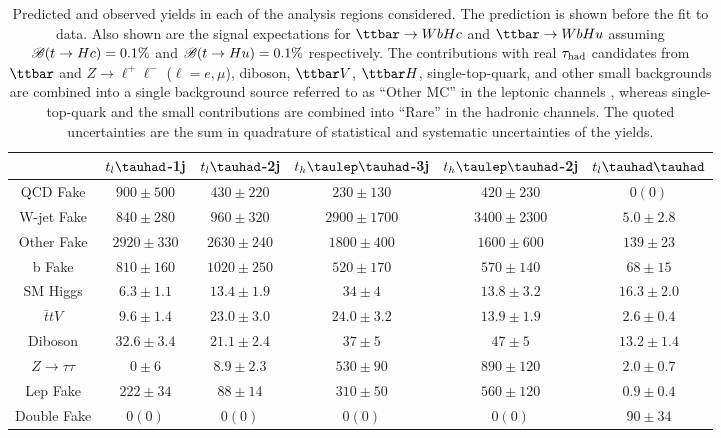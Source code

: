 \begin{table}[htbp]
\caption{
Predicted and observed yields in each of the analysis regions considered.
The prediction is shown before the fit to data. Also shown are the signal expectations for 
$\Hc$ and $\Hu$ assuming $\mathscr{B}(t\to Hc)=0.1\%$ and $\mathscr{B}(t\to Hu)=0.1\%$ respectively.
The contributions with real $\tau_{\mathrm{had}}$ candidates from $\ttbar$ and  $Z\to \ell^+\ell^-$ ($\ell = e, \mu$), diboson, $\ttbar V$, $\ttbar H$, single-top-quark, and other small backgrounds are combined into
a single background source referred to as ``Other MC'' in the leptonic channels , whereas single-top-quark and the small contributions are combined into ``Rare'' in the hadronic channels.  
The quoted uncertainties are the sum in quadrature of statistical and systematic uncertainties of the yields.}
\small
\centering
\begin{tabular}{cccccc} \toprule\toprule
 & $t_l\tauhad$-1j & $t_l\tauhad$-2j & $t_h\tlhad$-3j &$t_h\tlhad$-2j  & $t_l\thadhad$ \\\hline 
  QCD Fake                 & $900 \pm 500  $& $430 \pm 220  $& $230 \pm 130    $& $420 \pm 230        $& $0 (0)        $  \\ 
  W-jet Fake               & $840 \pm 280  $& $960 \pm 320  $& $2900 \pm 1700  $& $3400 \pm 2300      $& $5.0 \pm 2.8  $  \\ 
  Other Fake               & $2920 \pm 330 $& $2630 \pm 240 $& $1800 \pm 400   $& $1600 \pm 600       $& $139 \pm 23   $  \\ 
  b Fake                   & $810 \pm 160  $& $1020 \pm 250 $& $520 \pm 170    $& $570 \pm 140        $& $68 \pm 15    $  \\ 
  SM Higgs                 & $6.3 \pm 1.1  $& $13.4 \pm 1.9 $& $34 \pm 4       $& $13.8 \pm 3.2       $& $16.3 \pm 2.0 $  \\ 
  $\bar{t}tV$              & $9.6 \pm 1.4  $& $23.0 \pm 3.0 $& $24.0 \pm 3.2   $& $13.9 \pm 1.9       $& $2.6 \pm 0.4  $  \\ 
  Diboson                  & $32.6 \pm 3.4 $& $21.1 \pm 2.4 $& $37 \pm 5       $& $47 \pm 5           $& $13.2 \pm 1.4 $  \\ 
  $Z\rightarrow\tau\tau$   & $0 \pm 6      $& $8.9 \pm 2.3  $& $530 \pm 90     $& $890 \pm 120        $& $2.0 \pm 0.7  $  \\ 
  Lep Fake                 & $222 \pm 34   $& $88 \pm 14    $& $310 \pm 50     $& $560 \pm 120        $& $0.9 \pm 0.4  $  \\ 
  Double Fake              & $0 (0)        $& $0 (0)        $& $0 (0)          $& $0 (0)              $& $90 \pm 34    $ \\ 

\end{tabular}
\end{table}
